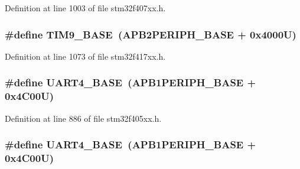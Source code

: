 Definition at line 1003 of file stm32f407xx.\+h.

\subsubsection[{\texorpdfstring{T\+I\+M9\+\_\+\+B\+A\+SE}{TIM9_BASE}}]{\setlength{\rightskip}{0pt plus 5cm}\#define T\+I\+M9\+\_\+\+B\+A\+SE~({\bf A\+P\+B2\+P\+E\+R\+I\+P\+H\+\_\+\+B\+A\+SE} + 0x4000\+U)}\hypertarget{group___peripheral__registers__structures_ga92ae902be7902560939223dd765ece08}{}\label{group___peripheral__registers__structures_ga92ae902be7902560939223dd765ece08}


Definition at line 1073 of file stm32f417xx.\+h.

\subsubsection[{\texorpdfstring{U\+A\+R\+T4\+\_\+\+B\+A\+SE}{UART4_BASE}}]{\setlength{\rightskip}{0pt plus 5cm}\#define U\+A\+R\+T4\+\_\+\+B\+A\+SE~({\bf A\+P\+B1\+P\+E\+R\+I\+P\+H\+\_\+\+B\+A\+SE} + 0x4\+C00\+U)}\hypertarget{group___peripheral__registers__structures_ga94d92270bf587ccdc3a37a5bb5d20467}{}\label{group___peripheral__registers__structures_ga94d92270bf587ccdc3a37a5bb5d20467}


Definition at line 886 of file stm32f405xx.\+h.

\subsubsection[{\texorpdfstring{U\+A\+R\+T4\+\_\+\+B\+A\+SE}{UART4_BASE}}]{\setlength{\rightskip}{0pt plus 5cm}\#define U\+A\+R\+T4\+\_\+\+B\+A\+SE~({\bf A\+P\+B1\+P\+E\+R\+I\+P\+H\+\_\+\+B\+A\+SE} + 0x4\+C00\+U)}\hypertarget{group___peripheral__registers__structures_ga94d92270bf587ccdc3a37a5bb5d20467}{}\label{group___peripheral__registers__structures_ga94d92270bf587ccdc3a37a5bb5d20467}


